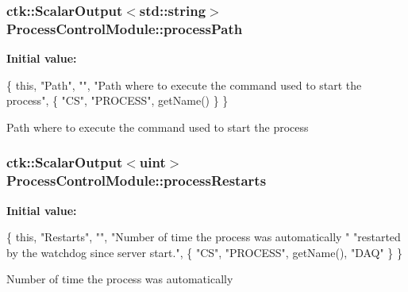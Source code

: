 \subsubsection[{\texorpdfstring{process\+Path}{processPath}}]{\setlength{\rightskip}{0pt plus 5cm}ctk\+::\+Scalar\+Output$<$std\+::string$>$ Process\+Control\+Module\+::process\+Path}\hypertarget{structProcessControlModule_a3910651f5e7ce2762a183b5917e0c1a2}{}\label{structProcessControlModule_a3910651f5e7ce2762a183b5917e0c1a2}
{\bfseries Initial value\+:}
\begin{DoxyCode}
\{ \textcolor{keyword}{this}, \textcolor{stringliteral}{"Path"}, \textcolor{stringliteral}{""},
      \textcolor{stringliteral}{"Path where to execute the command used to start the process"},
    \{  \textcolor{stringliteral}{"CS"}, \textcolor{stringliteral}{"PROCESS"}, getName() \} \}
\end{DoxyCode}
Path where to execute the command used to start the process 
\subsubsection[{\texorpdfstring{process\+Restarts}{processRestarts}}]{\setlength{\rightskip}{0pt plus 5cm}ctk\+::\+Scalar\+Output$<$uint$>$ Process\+Control\+Module\+::process\+Restarts}\hypertarget{structProcessControlModule_a52d785e727ec341c125e18c433f9fbe0}{}\label{structProcessControlModule_a52d785e727ec341c125e18c433f9fbe0}
{\bfseries Initial value\+:}
\begin{DoxyCode}
\{ \textcolor{keyword}{this}, \textcolor{stringliteral}{"Restarts"}, \textcolor{stringliteral}{""}, \textcolor{stringliteral}{"Number of time the process was automatically "}
          \textcolor{stringliteral}{"restarted by the watchdog since server start."},
    \{ \textcolor{stringliteral}{"CS"}, \textcolor{stringliteral}{"PROCESS"}, getName(), \textcolor{stringliteral}{"DAQ"} \} \}
\end{DoxyCode}
Number of time the process was automatically 
